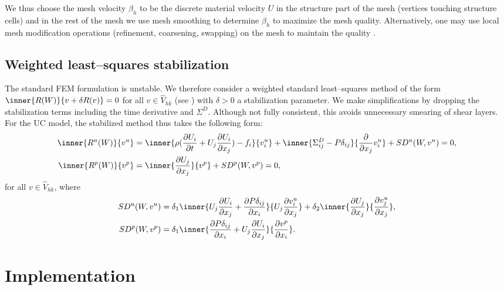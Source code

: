 We thus choose the mesh velocity $\beta_h$ to be the discrete material
velocity $U$ in the structure part of the mesh (vertices touching
structure cells) and in the rest of the mesh we use mesh smoothing to
determine $\beta_h$ to maximize the mesh quality. Alternatively, one
may use local mesh modification operations (refinement, coarsening,
swapping) on the mesh to maintain the quality
\citep{Comp`ereRemacleJanssonEtAl2009}.

\subsection{Weighted least--squares stabilization}

The standard FEM formulation is unstable.  We therefore consider a
weighted standard least--squares method of the form
$\inner{R(W)}{v + \delta R(v)} = 0$ for all $v \in \hat{V}_{hk}$ (see
\citet{ErikssonEstepHansboEtAl1996,HoffmanJohnson2007}) with $\delta > 0$ a stabilization
parameter. We make simplifications by dropping the stabilization terms
including the time derivative and $\Sigma^D$. Although not fully
consistent, this avoids unnecessary smearing of shear layers. For the
UC model, the stabilized method thus takes the following form:
\begin{align}
  \inner{R^u(W)}{v^u} &=
  \inner{\rho(\frac{\partial U_i}{\partial t} + U_j \frac{\partial U_i}{\partial x_j} ) - f_i}{v^u_i} +
  \inner{\Sigma^D_{ij} - P \delta_{ij}}{\frac{\partial}{\partial x_j} v^u_i} + SD^u(W, v^u) = 0, \\
  \inner{R^p(W)}{v^p} &= \inner{\frac{\partial U_j}{\partial x_j}}{v^p} + SD^p(W, v^p) = 0,
\end{align}
for all $v \in \hat{V}_{hk}$, where
\begin{align}
  SD^u(W, v^u) &=
  \delta_1 \inner{U_j \frac{\partial U_i}{\partial x_j} + \frac{\partial P \delta_{ij}}{\partial x_i}}{U_j \frac{\partial v^u_i}{\partial x_j} } +
  \delta_2 \inner{\frac{\partial U_j}{\partial x_j}}{\frac{\partial v^u_j}{\partial x_j} }, \\
  SD^p(W, v^p) &= \delta_1 \inner{\frac{\partial P \delta_{ij}}{\partial x_i} + U_j \frac{\partial U_i}{\partial x_j}}{\frac{\partial v^p}{\partial x_i}}.
\end{align}

\section{Implementation}

